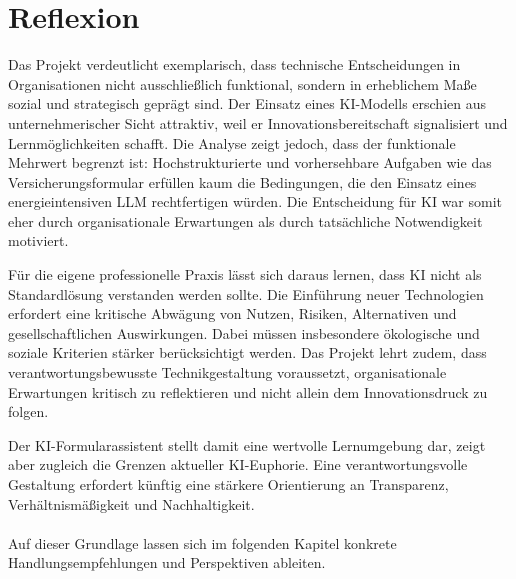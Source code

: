 \section{Reflexion}

Das Projekt verdeutlicht exemplarisch, dass technische Entscheidungen in Organisationen nicht ausschließlich funktional, sondern in erheblichem Maße sozial und strategisch geprägt sind. Der Einsatz eines KI-Modells erschien aus unternehmerischer Sicht attraktiv, weil er Innovationsbereitschaft signalisiert und Lernmöglichkeiten schafft. Die Analyse zeigt jedoch, dass der funktionale Mehrwert begrenzt ist: Hochstrukturierte und vorhersehbare Aufgaben wie das Versicherungsformular erfüllen kaum die Bedingungen, die den Einsatz eines energieintensiven LLM rechtfertigen würden. Die Entscheidung für KI war somit eher durch organisationale Erwartungen als durch tatsächliche Notwendigkeit motiviert.

Für die eigene professionelle Praxis lässt sich daraus lernen, dass KI nicht als Standardlösung verstanden werden sollte. Die Einführung neuer Technologien erfordert eine kritische Abwägung von Nutzen, Risiken, Alternativen und gesellschaftlichen Auswirkungen. Dabei müssen insbesondere ökologische und soziale Kriterien stärker berücksichtigt werden. Das Projekt lehrt zudem, dass verantwortungsbewusste Technikgestaltung voraussetzt, organisationale Erwartungen kritisch zu reflektieren und nicht allein dem Innovationsdruck zu folgen.

Der KI-Formularassistent stellt damit eine wertvolle Lernumgebung dar, zeigt aber zugleich die Grenzen aktueller KI-Euphorie. Eine verantwortungsvolle Gestaltung erfordert künftig eine stärkere Orientierung an Transparenz, Verhältnismäßigkeit und Nachhaltigkeit.

\paragraph{}

Auf dieser Grundlage lassen sich im folgenden Kapitel konkrete Handlungsempfehlungen und Perspektiven ableiten.